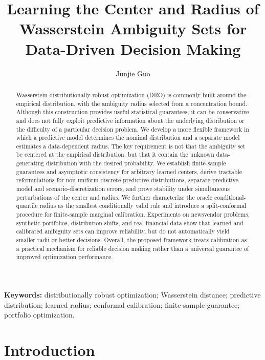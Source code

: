 \documentclass[11pt]{article}
\title{Learning the Center and Radius of Wasserstein Ambiguity Sets for Data-Driven Decision Making}
\author{Junjie Guo}
\date{}
\newcommand{\1}{\mathbf{1}}
\begin{document}
\maketitle

\begin{abstract}
Wasserstein distributionally robust optimization (DRO) is commonly built around the empirical distribution, with the ambiguity radius selected from a concentration bound. Although this construction provides useful statistical guarantees, it can be conservative and does not fully exploit predictive information about the underlying distribution or the difficulty of a particular decision problem. We develop a more flexible framework in which a predictive model determines the nominal distribution and a separate model estimates a data-dependent radius. The key requirement is not that the ambiguity set be centered at the empirical distribution, but that it contain the unknown data-generating distribution with the desired probability. We establish finite-sample guarantees and asymptotic consistency for arbitrary learned centers, derive tractable reformulations for non-uniform discrete predictive distributions, separate predictive-model and scenario-discretization errors, and prove stability under simultaneous perturbations of the center and radius. We further characterize the oracle conditional-quantile radius as the smallest conditionally valid rule and introduce a split-conformal procedure for finite-sample marginal calibration. Experiments on newsvendor problems, synthetic portfolios, distribution shifts, and real financial data show that learned and calibrated ambiguity sets can improve reliability, but do not automatically yield smaller radii or better decisions. Overall, the proposed framework treats calibration as a practical mechanism for reliable decision making rather than a universal guarantee of improved optimization performance.
\end{abstract}

\noindent\textbf{Keywords:} distributionally robust optimization; Wasserstein distance; predictive distribution; learned radius; conformal calibration; finite-sample guarantee; portfolio optimization.

\section{Introduction}
\end{document}
